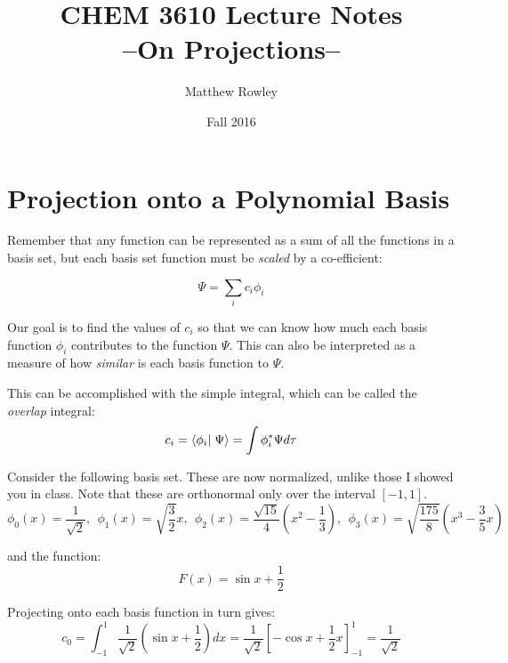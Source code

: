 \documentclass[12pt, openany, letterpaper]{memoir}
\begin{document}
\title{CHEM 3610 Lecture Notes\\--On Projections--}
\author{Matthew Rowley}
\date{Fall 2016}
\mainmatter
\maketitle
\section*{Projection onto a Polynomial Basis}

Remember that any function can be represented as a sum of all the functions in a basis set, but each basis set function must be \emph{scaled} by a co-efficient:

\begin{equation*}
	\Psi = \sum_i{c_i \phi_i}
\end{equation*}

Our goal is to find the values of $c_i$ so that we can know how much each basis function $\phi_i$ contributes to the function $\Psi$. This can also be interpreted as a measure of how \emph{similar} is each basis function to $\Psi$.

\vspace{1em}
This can be accomplished with the simple integral, which can be called the \emph{overlap} integral:
\begin{equation*}
	c_i = \braket{\phi_i}{\Psi} = \int{\phi_i^*\Psi d\tau}
\end{equation*}

\vspace{1em}
Consider the following basis set. These are now normalized, unlike those I showed you in class. Note that these are orthonormal only over the interval $[-1,1]$. 
\begin{equation*}
	\phi_0(x) = \frac{1}{\sqrt{2}}, ~~ \phi_1(x) = \sqrt{\frac{3}{2}}x, ~~ \phi_2(x) = \frac{\sqrt{15}}{4}\left(x^2-\frac{1}{3}\right), ~~ \phi_3(x) = \sqrt{\frac{175}{8}}\left(x^3 -\frac{3}{5}x\right)
\end{equation*}

and the function:
\begin{equation*}
	F(x) = \sin{x}+\frac{1}{2}
\end{equation*}

Projecting onto each basis function in turn gives:
\begin{equation*}
	c_0 = \int_{-1}^{1}\frac{1}{\sqrt{2}}\left(\sin{x}+\frac{1}{2}\right)dx = \frac{1}{\sqrt{2}}\left[-\cos{x}+\frac{1}{2}x\right]_{-1}^{1} = \frac{1}{\sqrt{2}}
\end{equation*}
\end{document}
